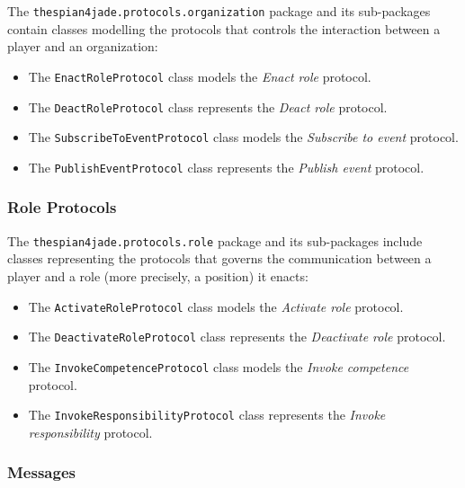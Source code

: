 The \texttt{thespian4jade.protocols.organization} package and its sub-packages contain classes modelling the protocols that controls the interaction between a player and an organization:
\begin{itemize}
	\item The \texttt{EnactRoleProtocol} class models the \textit{Enact role} protocol.
	\item The \texttt{DeactRoleProtocol} class represents the \textit{Deact role} protocol.
	\item The \texttt{SubscribeToEventProtocol} class models the \textit{Subscribe to event} protocol.
	\item The \texttt{PublishEventProtocol} class represents the \textit{Publish event} protocol.
\end{itemize}

\subsubsection{Role Protocols}

The \texttt{thespian4jade.protocols.role} package and its sub-packages include classes representing the protocols that governs the communication between a player and a role (more precisely, a position) it enacts:
\begin{itemize}
	\item The \texttt{ActivateRoleProtocol} class models the \textit{Activate role} protocol.
	\item The \texttt{DeactivateRoleProtocol} class represents the \textit{Deactivate role} protocol.
	\item The \texttt{InvokeCompetenceProtocol} class models the \textit{Invoke competence} protocol.
	\item The \texttt{InvokeResponsibilityProtocol} class represents the \textit{Invoke responsibility} protocol.
\end{itemize}

\subsubsection{Messages}

